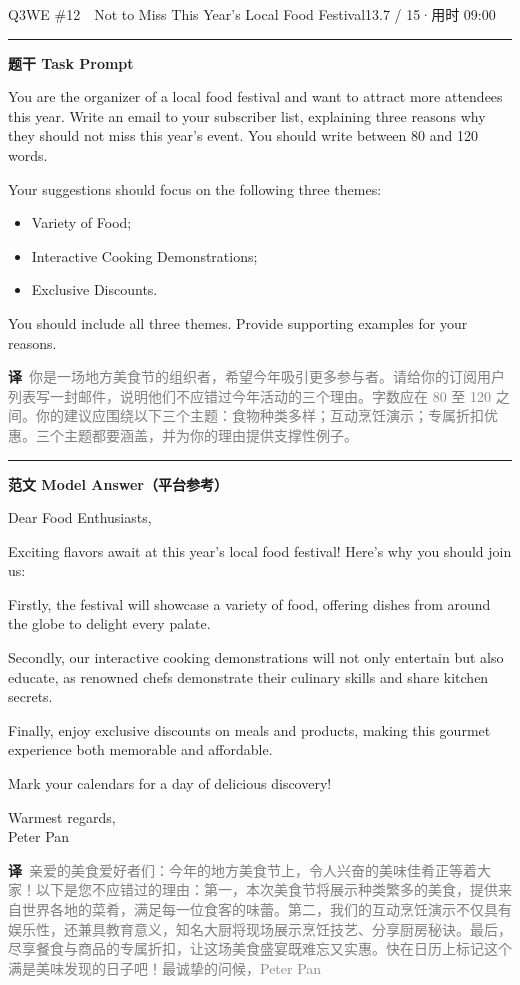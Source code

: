 \documentclass[11pt]{article}
\newcommand{\ptesub}[1]{%
  \par\needspace{2\baselineskip}\smallskip
  {\color{cAccent}\rule[-0.2ex]{3pt}{1.05em}}\hspace{6pt}%
  {\bfseries\color{cHead}#1}\par\nopagebreak\smallskip}
\newcommand{\zh}[1]{{\footnotesize\textcolor{cNote}{\textbf{译}}\ \textcolor{gray}{#1}}}
\begin{document}
\begin{qblock}{Q3\quad WE \#12\ \ Not to Miss This Year's Local Food Festival}{13.7 / 15\quad·\quad 用时 09:00}

\ptesub{题干 Task Prompt}
\begin{promptbox}
You are the organizer of a local food festival and want to attract more attendees this year. Write an email to your subscriber list, explaining three reasons why they should not miss this year's event. You should write between 80 and 120 words.

\smallskip Your suggestions should focus on the following three themes:
\begin{itemize}[leftmargin=1.4em,topsep=2pt,itemsep=0pt]
  \item Variety of Food;
  \item Interactive Cooking Demonstrations;
  \item Exclusive Discounts.
\end{itemize}
You should include all three themes. Provide supporting examples for your reasons.
\end{promptbox}
\zh{你是一场地方美食节的组织者，希望今年吸引更多参与者。请给你的订阅用户列表写一封邮件，说明他们不应错过今年活动的三个理由。字数应在 80 至 120 之间。你的建议应围绕以下三个主题：食物种类多样；互动烹饪演示；专属折扣优惠。三个主题都要涵盖，并为你的理由提供支撑性例子。}

\ptesub{范文 Model Answer（平台参考）}
\begin{modelbox}
Dear Food Enthusiasts,

Exciting flavors await at this year's local food festival! Here's why you should join us:

Firstly, the festival will showcase a variety of food, offering dishes from around the globe to delight every palate.

Secondly, our interactive cooking demonstrations will not only entertain but also educate, as renowned chefs demonstrate their culinary skills and share kitchen secrets.

Finally, enjoy exclusive discounts on meals and products, making this gourmet experience both memorable and affordable.

Mark your calendars for a day of delicious discovery!

Warmest regards,\\ Peter Pan
\end{modelbox}
\zh{亲爱的美食爱好者们：今年的地方美食节上，令人兴奋的美味佳肴正等着大家！以下是您不应错过的理由：第一，本次美食节将展示种类繁多的美食，提供来自世界各地的菜肴，满足每一位食客的味蕾。第二，我们的互动烹饪演示不仅具有娱乐性，还兼具教育意义，知名大厨将现场展示烹饪技艺、分享厨房秘诀。最后，尽享餐食与商品的专属折扣，让这场美食盛宴既难忘又实惠。快在日历上标记这个满是美味发现的日子吧！最诚挚的问候，Peter Pan}


\end{qblock}
\end{document}
